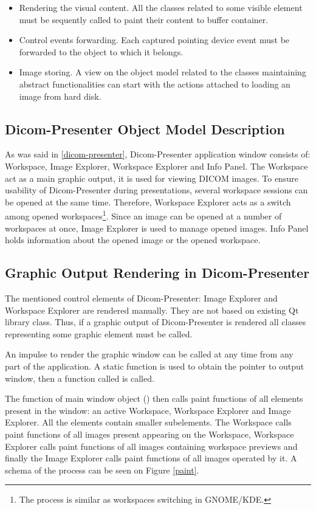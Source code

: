 \begin{itemize}
\item Rendering the visual content. All the classes related to some visible element must be sequently called to paint their content to buffer container.
\item Control events forwarding. Each captured pointing device event must be forwarded to the object to which it belongs.
\item Image storing. A view on the object model related to the classes maintaining abstract functionalities can start with the actions attached to loading an image from hard disk.
\end{itemize}

\subsection{Dicom-Presenter Object Model Description}
As was said in \ref{dicom-presenter}, Dicom-Presenter application window consists of:  Workspace, Image Explorer, Workspace Explorer and Info Panel. The Workspace act as a main graphic output, it is used for viewing DICOM images. To ensure usability of Dicom-Presenter during presentations, several workspace sessions can be opened at the same time. Therefore, Workspace Explorer acts as a switch among opened workspaces\footnote{The process is similar as workspaces switching in GNOME/KDE.}. Since an image can be opened at a number of workspaces at once, Image Explorer is used to manage opened images. Info Panel holds information about the opened image or the opened workspace.

\subsection{Graphic Output Rendering in Dicom-Presenter}
The mentioned control elements of Dicom-Presenter: Image Explorer and Workspace Explorer are rendered manually. They are not based on existing Qt library class. Thus, if a graphic output of Dicom-Presenter is rendered all classes representing some graphic element must be called. 

An impulse to render the graphic window can be called at any time from any part of the application. A static function is used to obtain the pointer to output window, then a function called  is called.

The  function of main window object () then calls paint functions of all elements present in the window: an active Workspace, Workspace Explorer and Image Explorer. All the elements contain smaller subelements. The Workspace calls paint functions of all images present appearing on the Workspace, Workspace Explorer calls paint functions of all images containing workspace previews and finally the Image Explorer calls paint functions of all images operated by it. A schema of the process can be seen on Figure \ref{paint}.

